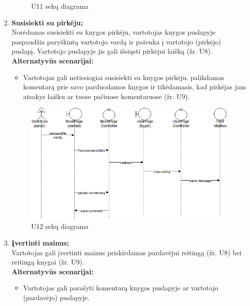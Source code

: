 \documentclass{VUMIFPSkursinis}
\begin{document}
\begin{enumerate}[label=\textbf{U\arabic*.}]
\begin{figure}[H]
					\caption{U11 sekų diagrama}
					\label{img:psi2-u11-sequence}
				\end{figure}
			\item \textbf{Susisiekti su pirkėju;}\\
				Norėdamas susisiekti su knygos pirkėju, vartotojas knygos puslapyje paspaudžia paryškintą vartotojo vardą ir patenka į vartotojo (pirkėjo) puslapį. Vartotojo puslapyje jis gali išsiųsti pirkėjui laišką (žr. U8).\\
				\textbf{Alternatyvūs scenarijai:}
				\begin{itemize}
					\item Vartotojas gali netiesiogiai susisiekti su knygos pirkėju, palikdamas komentarą prie savo parduodamos knygos ir tikėdamasis, kad pirkėjas jam atsakys laišku ar tuose pačiuose komentaruose (žr. U9).
				\end{itemize}
				\begin{figure}[H]
					\centering
					\includegraphics[scale=0.6]{img/12seq.png}
					\caption{U12 sekų diagrama}
					\label{img:psi2-u12-sequence}
				\end{figure}
			\item \textbf{Įvertinti mainus;}\\ %
				Vartotojas gali įvertinti mainus priskirdamas pardavėjui reitingą (žr. U8) bei reitingą knygai (žr. U9).\\
				\textbf{Alternatyvūs scenarijai:}
				\begin{itemize}
					\item Vartotojas gali parašyti komentarą knygos puslapyje ar vartotojo (pardavėjo) puslapyje.
				\end{itemize}
				\begin{figure}[H]
					\centering

\end{figure}
\end{enumerate}
\end{document}
